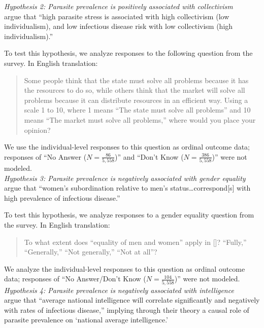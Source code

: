 \documentclass[12pt]{article}
\begin{document}
\noindent\textit{Hypothesis 2: Parasite prevalence is positively associated with collectivism}\\

\citet[pg117]{Thornhill2009} argue that ``high parasite stress is associated with high collectivism (low individualism), and low infectious disease risk with low collectivism (high individualism).'' 

To test this hypothesis, we analyze responses to the following question from the \citet{LB2008} survey.  In English translation:
\begin{quote}
\small
Some people think that the state must solve all problems because it has the resources to do so, while others think that the market will solve all problems because it can distribute resources in an efficient way. Using a scale 1 to 10, where 1 means ``The state must solve all problems'' and 10 means ``The market must solve all problems,'' where would you place your opinion?
 \end{quote}
We use the individual-level responses to this question as ordinal outcome data; responses of ``No Answer ($N=\frac{86}{5,558}$)'' and ``Don't Know ($N=\frac{386}{5,558}$)''  were not modeled.\\

\noindent\textit{Hypothesis 3: Parasite prevalence is negatively associated with gender equality}\\

\citet[pg113]{Thornhill2009} argue that ``women's subordination relative to men's status\dots correspond[s] with high prevalence of infectious disease.'' 

To test this hypothesis, we analyze responses to a gender equality question from the \citet{LB2008} survey. In English translation:
\begin{quote}
\small
To what extent does ``equality of men and women'' apply in [\textunderscore\textunderscore\textunderscore\textunderscore ]? ``Fully,'' ``Generally,'' ``Not generally,'' ``Not at all''?
 \end{quote}
We analyze the individual-level responses to this question as ordinal outcome data; responses of ``No Answer/Don't Know ($N=\frac{104}{5,558}$)'' were not modeled.\\

\noindent\textit{Hypothesis 4: Parasite prevalence is negatively associated with intelligence}\\

\citet[pg2]{Eppig2010} argue that ``average national intelligence will correlate significantly and negatively with rates of infectious disease,'' implying through their theory a causal role of parasite prevalence on `national average intelligence.'
\end{document}
